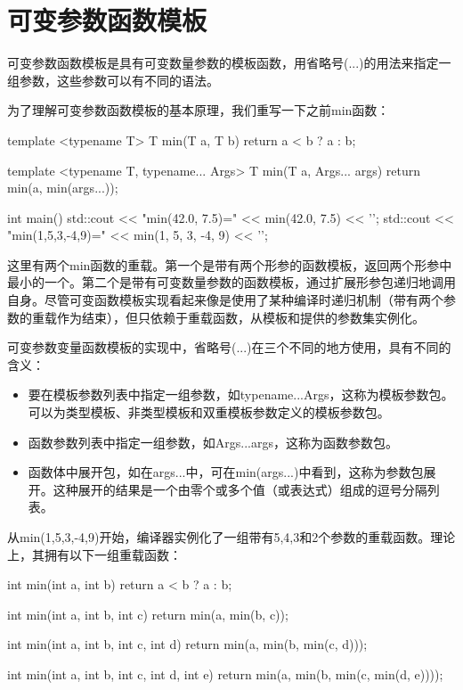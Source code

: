 \section{可变参数函数模板}
可变参数函数模板是具有可变数量参数的模板函数，用省略号(...)的用法来指定一组参数，这些参数可以有不同的语法。

为了理解可变参数函数模板的基本原理，我们重写一下之前min函数：

\begin{cpp}
template <typename T>
T min(T a, T b)
{
	return a < b ? a : b;
}

template <typename T, typename... Args>
T min(T a, Args... args)
{
	return min(a, min(args...));
}

int main()
{
	std::cout << "min(42.0, 7.5)=" << min(42.0, 7.5)
	          << '\n';
	std::cout << "min(1,5,3,-4,9)=" << min(1, 5, 3, -4, 9)
	          << '\n';
}
\end{cpp}

这里有两个min函数的重载。第一个是带有两个形参的函数模板，返回两个形参中最小的一个。第二个是带有可变数量参数的函数模板，通过扩展形参包递归地调用自身。尽管可变函数模板实现看起来像是使用了某种编译时递归机制（带有两个参数的重载作为结束），但只依赖于重载函数，从模板和提供的参数集实例化。

可变参数变量函数模板的实现中，省略号(...)在三个不同的地方使用，具有不同的含义：

\begin{itemize}
\item
要在模板参数列表中指定一组参数，如typename...Args，这称为模板参数包。可以为类型模板、非类型模板和双重模板参数定义的模板参数包。

\item
函数参数列表中指定一组参数，如Args...args，这称为函数参数包。

\item
函数体中展开包，如在args...中，可在min(args...)中看到，这称为参数包展开。这种展开的结果是一个由零个或多个值（或表达式）组成的逗号分隔列表。
\end{itemize}

从min(1,5,3,-4,9)开始，编译器实例化了一组带有5,4,3和2个参数的重载函数。理论上，其拥有以下一组重载函数：

\begin{cpp}
int min(int a, int b)
{
	return a < b ? a : b;
}

int min(int a, int b, int c)
{
	return min(a, min(b, c));
}

int min(int a, int b, int c, int d)
{
	return min(a, min(b, min(c, d)));
}

int min(int a, int b, int c, int d, int e)
{
	return min(a, min(b, min(c, min(d, e))));
}
\end{cpp}

